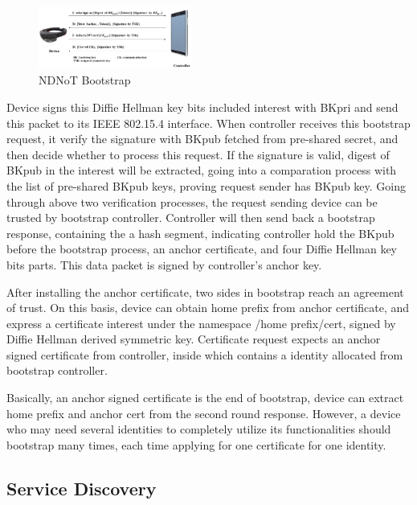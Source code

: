 \documentclass[sigconf]{acmart}
\begin{document}
\begin{figure}[h]
	\vspace{-0.1cm}
	\centering
	\includegraphics[width=0.45\textwidth]{figures/bootstrap}
	\caption{NDNoT Bootstrap}
	\vspace{-0.1cm}
	\label{fig:bootstrap}
\end{figure}

Device signs this Diffie Hellman key bits included interest with BKpri and send this packet to its IEEE 802.15.4 interface. When controller receives this bootstrap request, it
verify the signature with BKpub fetched from pre-shared secret, and then decide whether to process this request. If the signature is valid,
digest of BKpub in the interest will be extracted, going into a comparation process with the list of pre-shared BKpub keys, proving request
sender has BKpub key. Going through above two verification processes, the request sending device can be trusted by bootstrap controller.
Controller will then send back a bootstrap response, containing the a hash segment, indicating controller hold the BKpub before the bootstrap process, 
an anchor certificate, and four Diffie Hellman key bits parts. This data packet is signed by controller's anchor key. 

After installing the anchor certificate, two sides in bootstrap reach an agreement of trust. On this basis, device can obtain home prefix from 
anchor certificate, and express a certificate interest under the namespace /{home prefix}/cert, signed by Diffie Hellman derived symmetric key.
Certificate request expects an anchor signed certificate from controller, inside which contains a identity allocated from bootstrap controller. 

Basically, an anchor signed certificate is the end of bootstrap, device can extract home prefix and anchor cert from the second round response. 
However, a device who may need several identities to completely utilize its functionalities should bootstrap many times, each time applying for 
one certificate for one identity. 

\subsection{Service Discovery}
\end{document}
